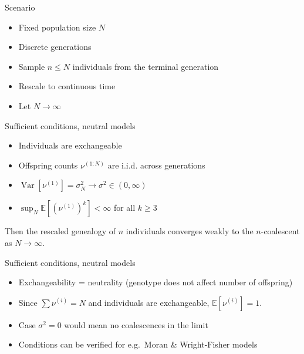 \documentclass[aspectratio=169]{beamer}
\theoremstyle{definition}
\newcommand{\E}{\mathbb{E}}
\newcommand{\V}{\operatorname{Var}}
\begin{document}
\begin{frame}{Scenario}
\begin{itemize}
\item Fixed population size $N$
\item Discrete generations
\item Sample $n \leq N$ individuals from the terminal generation
\item Rescale to continuous time
\item Let $N\to\infty$
\end{itemize}
\end{frame}


\begin{frame}{Sufficient conditions, neutral models}
\begin{theorem}[Kingman 1982]
\begin{itemize}
\item Individuals are exchangeable
\item Offspring counts $\nu^{(1:N)}$ are i.i.d. across generations
\item $\V[ \nu^{(1)} ] = \sigma_N^2 \longrightarrow \sigma^2 \in (0,\infty)$
\item $\sup_N \E[ (\nu^{(1)})^k] <\infty$ for all $k\geq 3$
\end{itemize}
Then the rescaled genealogy of $n$ individuals converges weakly to the $n$-coalescent as $N\to\infty$.
\end{theorem}
\end{frame}


\begin{frame}{Sufficient conditions, neutral models}
\begin{itemize}
\item Exchangeability = neutrality (genotype does not affect number of offspring)
\item Since $\sum \nu^{(i)} = N$ and individuals are exchangeable, $\E[\nu^{(i)}] = 1$.
\item Case $\sigma^2 = 0$ would mean no coalescences in the limit
\item Conditions can be verified for e.g.\ Moran \& Wright-Fisher models
\end{itemize}
\end{frame}
\end{document}

